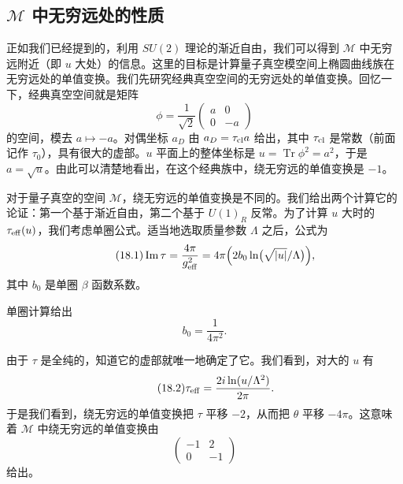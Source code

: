 \subsection{$\mathcal{M}$ 中无穷远处的性质}

正如我们已经提到的，利用 $SU(2)$ 理论的渐近自由，我们可以得到 $\mathcal{M}$ 中无穷远附近（即 $u$ 大处）的信息。这里的目标是计算量子真空模空间上椭圆曲线族在无穷远处的单值变换。我们先研究经典真空空间的无穷远处的单值变换。回忆一下，经典真空空间就是矩阵
\[
\phi=\frac{1}{\sqrt2}\begin{pmatrix}a&0\\0&-a\end{pmatrix}
\]
的空间，模去 $a\mapsto-a$。对偶坐标 $a_D$ 由 $a_D=\tau_{\rm cl}a$ 给出，其中 $\tau_{\rm cl}$ 是常数（前面记作 $\tau_0$），具有很大的虚部。$u$ 平面上的整体坐标是 $u=\operatorname{Tr}\phi^2=a^2$，于是 $a=\sqrt u$。由此可以清楚地看出，在这个经典族中，绕无穷远的单值变换是 $-1$。

对于量子真空的空间 $\mathcal{M}$，绕无穷远的单值变换是不同的。我们给出两个计算它的论证：第一个基于渐近自由，第二个基于 $U(1)_R$ 反常。为了计算 $u$ 大时的 $\tau_{\rm eff}(u)$，我们考虑单圈公式。适当地选取质量参数 $\Lambda$ 之后，公式为
\begin{equation}
\tag{18.1}
\label{eq:18-1}
\operatorname{Im}\tau=\frac{4\pi}{g_{\rm eff}^2}=4\pi\Bigl(2b_0\ln\bigl(\sqrt{|u|}/\Lambda\bigr)\Bigr),
\end{equation}
其中 $b_0$ 是单圈 $\beta$ 函数系数。

单圈计算给出
\[
b_0=\frac{1}{4\pi^2}.
\]

由于 $\tau$ 是全纯的，知道它的虚部就唯一地确定了它。我们看到，对大的 $u$ 有
\begin{equation}
\tag{18.2}
\label{eq:18-2}
\tau_{\rm eff}=\frac{2i\ln(u/\Lambda^2)}{2\pi}.
\end{equation}
于是我们看到，绕无穷远的单值变换把 $\tau$ 平移 $-2$，从而把 $\theta$ 平移 $-4\pi$。这意味着 $\mathcal{M}$ 中绕无穷远的单值变换由
\[
\begin{pmatrix}-1&2\\0&-1\end{pmatrix}
\]
给出。


